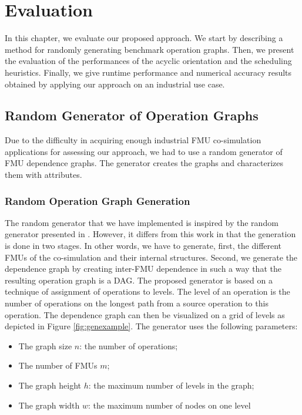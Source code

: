 \chapter{\label{ch:6-eval}Evaluation}

\minitoc

In this chapter, we evaluate our proposed approach. We start by describing a method for randomly generating benchmark operation graphs. Then, we present the evaluation of the performances of the acyclic orientation and the scheduling heuristics. Finally, we give runtime performance and numerical accuracy results obtained by applying our approach on an industrial use case.

\section{Random Generator of Operation Graphs}

Due to the difficulty in acquiring enough industrial FMU co-simulation applications for assessing our approach, we had to use a random generator of FMU dependence graphs. The generator creates the graphs and characterizes them with attributes.

\subsection{Random Operation Graph Generation}

The random generator that we have implemented is inspired by the random generator presented in \cite{kalla:2004}. However, it differs from this work in that the generation is done in two stages. In other words, we have to generate, first, the different FMUs of the co-simulation and their internal structures. Second, we generate the dependence graph by creating inter-FMU dependence in such a way that the resulting operation graph is a DAG. The proposed generator is based on a technique of assignment of operations to levels. The level of an operation is the number of operations on the longest path from a source operation to this operation. The dependence graph can then be visualized on a grid of levels as depicted in Figure \ref{fig:genexample}. The generator uses the following parameters:

\begin{itemize}
\item The graph size $n$: the number of operations;
\item The number of FMUs $m$;
\item The graph height $h$: the maximum number of levels in the graph;
\item The graph width $w$: the maximum number of nodes on one level
\end{itemize}

